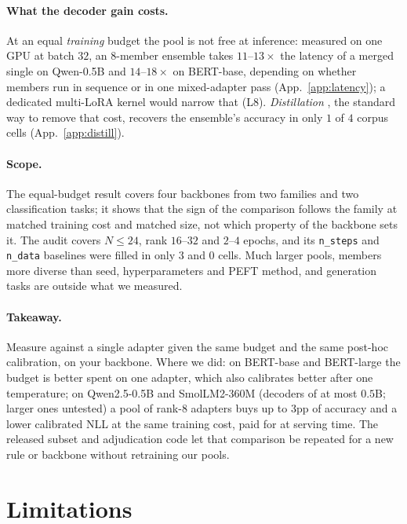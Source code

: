 \documentclass[11pt]{article}
\begin{document}
\paragraph{What the decoder gain costs.} At an equal \emph{training} budget the pool is not free at inference: measured on one GPU at batch $32$, an $8$-member ensemble takes $11$--$13\times$ the latency of a merged single on Qwen-0.5B and $14$--$18\times$ on BERT-base, depending on whether members run in sequence or in one mixed-adapter pass (App.~\ref{app:latency}); a dedicated multi-LoRA kernel would narrow that (L8). \emph{Distillation} \citep{hinton2015distilling}, the standard way to remove that cost, recovers the ensemble's accuracy in only $1$ of $4$ corpus cells (App.~\ref{app:distill}).

\paragraph{Scope.} The equal-budget result covers four backbones from two families and two classification tasks; it shows that the sign of the comparison follows the family at matched training cost and matched size, not which property of the backbone sets it. The audit covers $N{\leq}24$, rank $16$--$32$ and $2$--$4$ epochs, and its \texttt{n\_steps} and \texttt{n\_data} baselines were filled in only $3$ and $0$ cells. Much larger pools, members more diverse than seed, hyperparameters and PEFT method, and generation tasks are outside what we measured.

\paragraph{Takeaway.} Measure against a single adapter given the same budget and the same post-hoc calibration, on your backbone. Where we did: on BERT-base and BERT-large the budget is better spent on one adapter, which also calibrates better after one temperature; on Qwen2.5-0.5B and SmolLM2-360M (decoders of at most $0.5$B; larger ones untested) a pool of rank-$8$ adapters buys up to $3$pp of accuracy and a lower calibrated NLL at the same training cost, paid for at serving time. The released subset and adjudication code let that comparison be repeated for a new rule or backbone without retraining our pools.

\FloatBarrier
\section*{Limitations}
\end{document}
